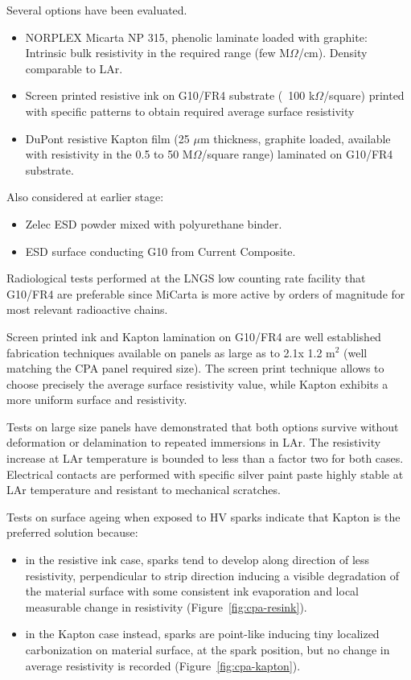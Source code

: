 Several options have been evaluated.
\begin{itemize}	
\item NORPLEX Micarta NP 315, phenolic laminate loaded with graphite: Intrinsic bulk resistivity in the required range (few M$\Omega$/cm). Density comparable to LAr.
\item Screen printed resistive ink on G10/FR4 substrate (~100 k$\Omega$/square) printed with specific patterns to obtain required average surface resistivity
\item DuPont resistive Kapton film  (25 $\mu$m thickness, graphite loaded, available with resistivity in the 0.5 to 50 M$\Omega$/square range) laminated on G10/FR4 substrate.
\end{itemize}
Also considered at earlier stage:
\begin{itemize}	
\item Zelec ESD powder mixed with polyurethane binder.
\item ESD surface conducting G10 from Current Composite.
\end{itemize}

Radiological tests performed at the LNGS low counting rate facility that G10/FR4 are preferable since MiCarta is more active by orders of magnitude for most relevant radioactive chains.
 
Screen printed ink and Kapton lamination on G10/FR4 are well established fabrication techniques available on panels as large as to 2.1x 1.2 m$^2$ (well matching the CPA panel required size). The screen print technique allows to choose precisely the average surface resistivity value, while Kapton exhibits a more uniform surface and resistivity. 

Tests on large size panels have demonstrated that both options survive without deformation or delamination to repeated immersions in LAr. The resistivity increase at LAr temperature is bounded to less than a factor two for both cases. Electrical contacts are performed with  specific  silver paint paste  highly stable at LAr temperature and resistant to mechanical scratches.

Tests on surface ageing when exposed to HV sparks indicate that Kapton is the preferred solution because:
\begin{itemize}	
\item in the resistive ink case, sparks tend to develop along direction of less resistivity, perpendicular to strip direction inducing a visible degradation of the material surface with some consistent ink evaporation and local measurable change in resistivity (Figure~\ref{fig:cpa-resink}).
\item in the Kapton case instead, sparks are point-like inducing tiny localized carbonization on material surface, at the spark position, but no change in average resistivity is recorded (Figure~\ref{fig:cpa-kapton}). 
\end{itemize}

